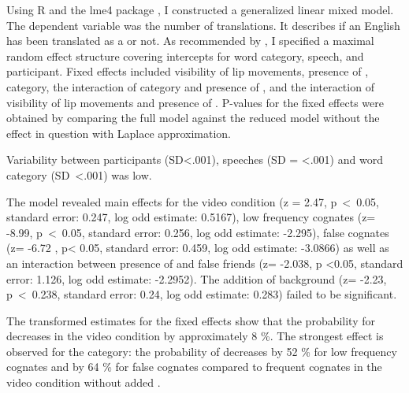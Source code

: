 \documentclass[output=paper]{LSP/langsci}
\begin{document}
Using R \citep{RCoreTeam2014} and the lme4 package \citep{Bates2015}, I constructed a generalized linear mixed model. The dependent variable was the number of  translations. It describes if an English  has been translated as a   or not. As recommended by \citet{Barr2013}, I specified a maximal random effect structure covering intercepts for word category, speech, and participant. Fixed effects included visibility of lip movements, presence of ,  category, the interaction of  category and presence of , and the interaction of visibility of lip movements and presence of . P-values for the fixed effects were obtained by comparing the full model against the reduced model without the effect in question with Laplace approximation.

Variability between participants (SD<.001), speeches (SD = <.001) and word category (SD~<.001) was low. 

The model revealed main effects for the video condition (z = 2.47, p~<~0.05, standard error: 0.247, log odd estimate: 0.5167), low frequency cognates (z= -8.99, p~<~0.05, standard error: 0.256, log odd estimate: -2.295), false cognates (z= -6.72 , p< 0.05, standard error: 0.459, log odd estimate: -3.0866) as well as an interaction between presence of  and false friends (z= -2.038, p <0.05, standard error: 1.126, log odd estimate: -2.2952). The addition of background  (z= -2.23, p~<~0.238, standard error: 0.24, log odd estimate: 0.283) failed to be significant.

The transformed estimates for the fixed effects show that the probability for  decreases in the video condition by approximately 8 \%. The strongest effect is observed for the  category: the probability of  decreases by 52 \% for low frequency cognates and by 64 \% for false cognates compared to frequent cognates in the video condition without added . 
\end{document}
